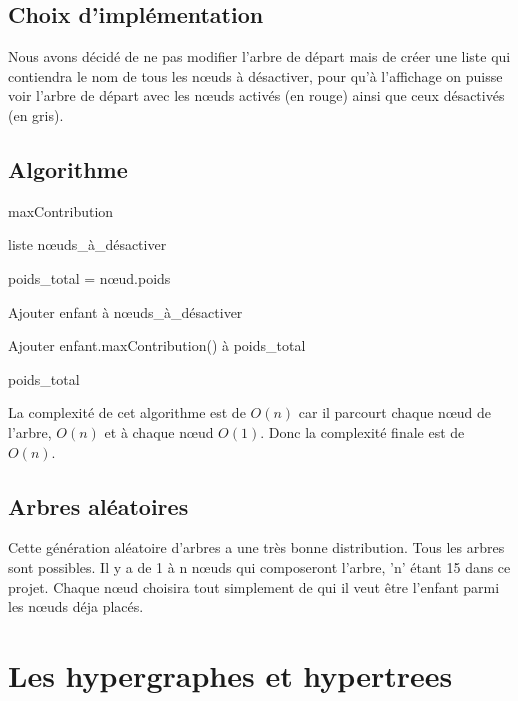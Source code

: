 \documentclass{article}
\begin{document}
	\subsection{Choix d'implémentation}

		Nous avons décidé de ne pas modifier l'arbre de départ mais de créer une liste qui contiendra le nom de tous les nœuds à désactiver, pour qu'à l'affichage on puisse voir l'arbre de départ avec les nœuds activés (en rouge) ainsi que ceux désactivés (en gris).
	
	
		\subsection{Algorithme}
		
		\begin{algorithm}[H]
		\caption{maxContribution}
		\begin{algorithmic}[1]
		\REQUIRE liste nœuds\_à\_désactiver

		\STATE poids\_total = nœud.poids
	
	
		\STATE Ajouter enfant à nœuds\_à\_désactiver

		\ELSE
		\STATE Ajouter enfant.maxContribution() à poids\_total
	
		\ENDIF	
		\ENDFOR

		\RETURN poids\_total

		\end{algorithmic}
		\end{algorithm}
	
		La complexité de cet algorithme est de $O(n)$ car il parcourt chaque nœud de l'arbre, $O(n)$ et à chaque nœud $O(1)$. Donc la complexité finale est de $O(n)$.
		
	\subsection{Arbres aléatoires}
	Cette génération aléatoire d'arbres a une très bonne distribution. Tous les arbres sont possibles. Il y a  de 1 à n nœuds qui composeront l'arbre, 'n' étant 15 dans ce projet. Chaque nœud choisira tout simplement de qui il veut être l'enfant parmi les nœuds déja placés.
	
\section{Les hypergraphes et hypertrees}
\end{document}

